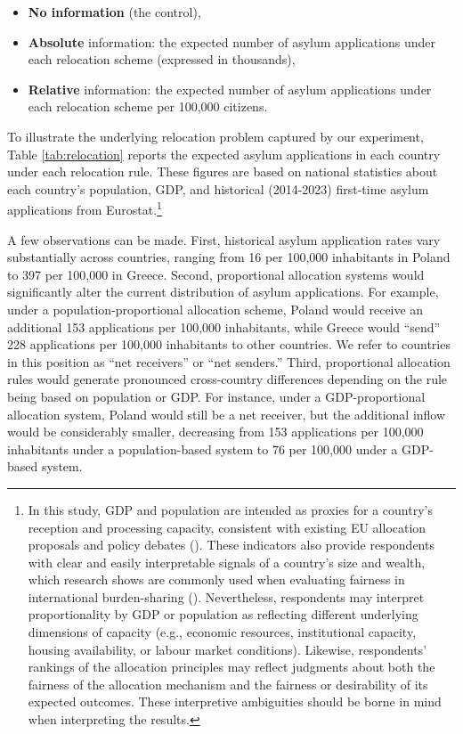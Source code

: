 \documentclass[
  12pt,
  a4paper,
]{article}
\providecommand{\tightlist}{%
  \setlength{\itemsep}{0pt}\setlength{\parskip}{0pt}}
\begin{document}
\begin{itemize}
\tightlist
\item
  \textbf{No information} (the control),
\item
  \textbf{Absolute} information: the expected number of asylum applications under each relocation scheme (expressed in thousands),
\item
  \textbf{Relative} information: the expected number of asylum applications under each relocation scheme per 100,000 citizens.
\end{itemize}

To illustrate the underlying relocation problem captured by our experiment, Table \ref{tab:relocation} reports the expected asylum applications in each country under each relocation rule. These figures are based on national statistics about each country's population, GDP, and historical (2014-2023) first-time asylum applications from Eurostat.\footnote{
  In this study, GDP and population are intended as proxies for a country's reception and processing capacity, consistent with existing EU allocation proposals and policy debates (). These indicators also provide respondents with clear and easily interpretable signals of a country's size and wealth, which research shows are commonly used when evaluating fairness in international burden-sharing (). Nevertheless, respondents may interpret proportionality by GDP or population as reflecting different underlying dimensions of capacity (e.g., economic resources, institutional capacity, housing availability, or labour market conditions). Likewise, respondents' rankings of the allocation principles may reflect judgments about both the fairness of the allocation mechanism and the fairness or desirability of its expected outcomes. These interpretive ambiguities should be borne in mind when interpreting the results.}

A few observations can be made. First, historical asylum application rates vary substantially across countries, ranging from 16 per 100,000 inhabitants in Poland to 397 per 100,000 in Greece. Second, proportional allocation systems would significantly alter the current distribution of asylum applications. For example, under a population-proportional allocation scheme, Poland would receive an additional 153 applications per 100,000 inhabitants, while Greece would ``send'' 228 applications per 100,000 inhabitants to other countries. We refer to countries in this position as ``net receivers'' or ``net senders.'' Third, proportional allocation rules would generate pronounced cross-country differences depending on the rule being based on population or GDP. For instance, under a GDP-proportional allocation system, Poland would still be a net receiver, but the additional inflow would be considerably smaller, decreasing from 153 applications per 100,000 inhabitants under a population-based system to 76 per 100,000 under a GDP-based system.
\end{document}
